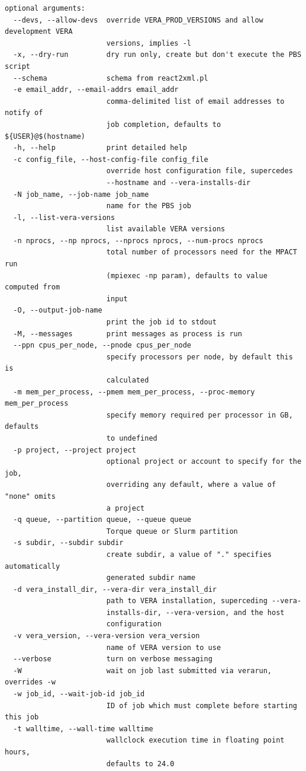 \begin{Verbatim}[fontsize=\small]
optional arguments:
  --devs, --allow-devs  override VERA_PROD_VERSIONS and allow development VERA
                        versions, implies -l
  -x, --dry-run         dry run only, create but don't execute the PBS script
  --schema              schema from react2xml.pl
  -e email_addr, --email-addrs email_addr
                        comma-delimited list of email addresses to notify of
                        job completion, defaults to ${USER}@$(hostname)
  -h, --help            print detailed help
  -c config_file, --host-config-file config_file
                        override host configuration file, supercedes
                        --hostname and --vera-installs-dir
  -N job_name, --job-name job_name
                        name for the PBS job
  -l, --list-vera-versions
                        list available VERA versions
  -n nprocs, --np nprocs, --nprocs nprocs, --num-procs nprocs
                        total number of processors need for the MPACT run
                        (mpiexec -np param), defaults to value computed from
                        input
  -O, --output-job-name
                        print the job id to stdout
  -M, --messages        print messages as process is run
  --ppn cpus_per_node, --pnode cpus_per_node
                        specify processors per node, by default this is
                        calculated
  -m mem_per_process, --pmem mem_per_process, --proc-memory mem_per_process
                        specify memory required per processor in GB, defaults
                        to undefined
  -p project, --project project
                        optional project or account to specify for the job,
                        overriding any default, where a value of "none" omits
                        a project
  -q queue, --partition queue, --queue queue
                        Torque queue or Slurm partition
  -s subdir, --subdir subdir
                        create subdir, a value of "." specifies automatically
                        generated subdir name
  -d vera_install_dir, --vera-dir vera_install_dir
                        path to VERA installation, superceding --vera-
                        installs-dir, --vera-version, and the host
                        configuration
  -v vera_version, --vera-version vera_version
                        name of VERA version to use
  --verbose             turn on verbose messaging
  -W                    wait on job last submitted via verarun, overrides -w
  -w job_id, --wait-job-id job_id
                        ID of job which must complete before starting this job
  -t walltime, --wall-time walltime
                        wallclock execution time in floating point hours,
                        defaults to 24.0


\end{Verbatim}
